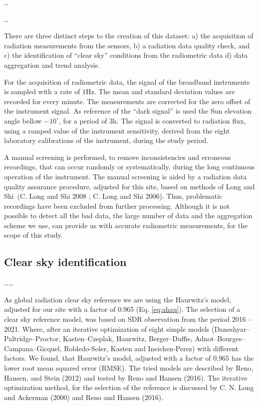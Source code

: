 \documentclass[
  preprint, 3p, authoryear]{article}
\begin{document}
\ldots{}

\ldots{}

There are three distinct steps to the creation of this dataset:
a) the acquisition of radiation measurements from the sensors,
b) a radiation data quality check, and
c) the identification of ``clear sky'' conditions from the radiometric data
d) data aggregation and trend analysis.

For the acquisition of radiometric data,
the signal of the broadband instruments is sampled with a rate of \(1 \text{Hz}\). The mean and standard deviation values are recorded for every minute.
The measurements are corrected for the zero offset of the instrument signal.
As reference of the ``dark signal'' is used the Sun elevation angle bellow \(-10^\circ\), for a period of \(3 \text{h}\).
The signal is converted to radiation flux, using a ramped value of the instrument sensitivity, derived from the eight laboratory calibrations of the instrument, during the study period.

A manual screening is performed, to remove inconsistencies and erroneous recordings, that can occur randomly or systematically, during the long continuous operation of the instrument.
The manual screening is aided by a radiation data quality assurance procedure, adjusted for this site, based on methods of Long and Shi~(C. Long and Shi 2008 ; C. Long and Shi 2006).
Thus, problematic recordings have been excluded from further processing.
Although it is not possible to detect all the bad data, the large number of data and the aggregation scheme we use, can provide us with accurate radiometric measurements, for the scope of this study.

\hypertarget{clear-sky-identification}{%
\subsection{Clear sky identification}\label{clear-sky-identification}}

\ldots\ldots{}

As global radiation clear sky reference we are using the Haurwitz's model, adjusted for our site with a factor of 0.965 (Eq. \ref{eq:ahau}).
The selection of a clear sky reference model, was based on SDR observation from the period 2016 -- 2021.
Where, after an iterative optimization of eight simple models (Daneshyar--Paltridge--Proctor, Kasten--Czeplak, Haurwitz, Berger--Duffie, Adnot--Bourges--Campana--Gicquel, Robledo-Soler, Kasten and Ineichen-Perez) with different factors.
We found, that Haurwitz's model, adjusted with a factor of 0.965 has the lower root mean squared error (RMSE).
The tried models are described by Reno, Hansen, and Stein (2012) and tested by Reno and Hansen (2016).
The iterative optimization method, for the selection of the reference is discussed by C. N. Long and Ackerman (2000) and Reno and Hansen (2016).
\end{document}
